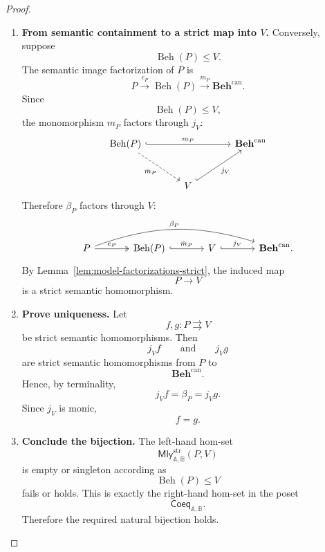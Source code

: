 \begin{proof}
\begin{enumerate}
        \item \textbf{From semantic containment to a strict map into \(V\).}
        Conversely, suppose
        \[
            \operatorname{Beh}(P)\leq V.
        \]
        The semantic image factorization of \(P\) is
        \[
            P
                \xrightarrow{e_P}
            \operatorname{Beh}(P)
                \xrightarrow{m_P}
            \mathbf{Beh}^{\mathrm{can}}.
        \]
        Since
        \[
            \operatorname{Beh}(P)\leq V,
        \]
        the monomorphism \(m_P\) factors through \(j_V\):
        \[
        \begin{tikzcd}[column sep=large, row sep=large]
            \operatorname{Beh}(P)
                \arrow[rr, hook, "m_P"]
                \arrow[dr, dashed, "\bar m_P"']
            &&
            \mathbf{Beh}^{\mathrm{can}}
            \\
            &
            V
                \arrow[ur, hook, "j_V"']
            &
        \end{tikzcd}
        \]
        Therefore \(\beta_P\) factors through \(V\):
        \[
        \begin{tikzcd}[column sep=large, row sep=large]
            P
                \arrow[r, two heads, "e_P"]
                \arrow[rrr, bend left=18, "\beta_P"]
            &
            \operatorname{Beh}(P)
                \arrow[r, hook, "\bar m_P"]
            &
            V
                \arrow[r, hook, "j_V"]
            &
            \mathbf{Beh}^{\mathrm{can}} .
        \end{tikzcd}
        \]
        By Lemma~\ref{lem:model-factorizations-strict}, the induced map
        \[
            P\to V
        \]
        is a strict semantic homomorphism.

        \item \textbf{Prove uniqueness.}
        Let
        \[
            f,g:P\rightrightarrows V
        \]
        be strict semantic homomorphisms. Then
        \[
            j_Vf
            \qquad\text{and}\qquad
            j_Vg
        \]
        are strict semantic homomorphisms from \(P\) to
        \[
            \mathbf{Beh}^{\mathrm{can}}.
        \]
        Hence, by terminality,
        \[
            j_Vf=\beta_P=j_Vg.
        \]
        Since \(j_V\) is monic,
        \[
            f=g.
        \]

        \item \textbf{Conclude the bijection.}
        The left-hand hom-set
        \[
            \mathsf{Mly}^{\mathrm{str}}_{\mathbb A,\mathbb B}(P,V)
        \]
        is empty or singleton according as
        \[
            \operatorname{Beh}(P)\leq V
        \]
        fails or holds. This is exactly the right-hand hom-set in the poset
        \[
            \mathsf{Coeq}_{\mathbb A,\mathbb B}.
        \]
        Therefore the required natural bijection holds.
    \end{enumerate}
\end{proof}

